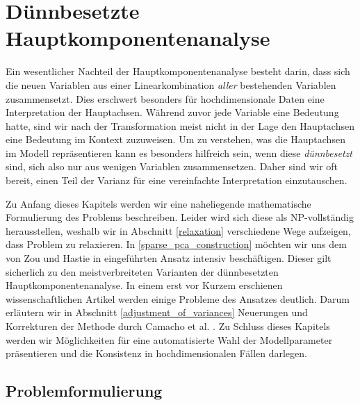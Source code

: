 \chapter{Dünnbesetzte Hauptkomponentenanalyse}

\label{sparse_pca}

Ein wesentlicher Nachteil der Hauptkomponentenanalyse besteht darin, dass sich die neuen Variablen aus einer Linearkombination \textit{aller} bestehenden Variablen zusammensetzt. Dies erschwert besonders für hochdimensionale Daten eine Interpretation der Hauptachsen. Während zuvor jede Variable eine Bedeutung hatte, sind wir nach der Transformation meist nicht in der Lage den Hauptachsen eine Bedeutung im Kontext zuzuweisen. Um zu verstehen, was die Hauptachsen im Modell repräsentieren kann es besonders hilfreich sein, wenn diese \textit{dünnbesetzt} sind, sich also nur aus wenigen Variablen zusammensetzen. Daher sind wir oft bereit, einen Teil der Varianz für eine vereinfachte Interpretation einzutauschen.

Zu Anfang dieses Kapitels werden wir eine naheliegende mathematische Formulierung des Problems beschreiben. Leider wird sich diese als NP-vollständig herausstellen, weshalb wir in Abschnitt \ref{relaxation} verschiedene Wege aufzeigen, dass Problem zu relaxieren. In \ref{sparse_pca_construction} möchten wir uns dem von Zou und Hastie in \cite{zou_sparsepca} eingeführten Ansatz intensiv beschäftigen. Dieser gilt sicherlich zu den meistverbreiteten Varianten der dünnbesetzten Hauptkomponentenanalyse. In einem erst vor Kurzem erschienen wissenschaftlichen Artikel werden einige Probleme des Ansatzes deutlich. Darum erläutern wir in Abschnitt \ref{adjustment_of_variances} Neuerungen und Korrekturen der Methode durch Camacho et al. \cite{camacho}. Zu Schluss dieses Kapitels werden wir Möglichkeiten für eine automatisierte Wahl der Modellparameter präsentieren und die Konsistenz in hochdimensionalen Fällen darlegen.




\section{Problemformulierung}
\label{problem_formulation}

